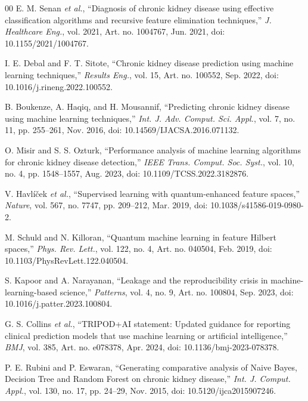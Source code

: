 \documentclass[conference]{IEEEtran}
\begin{document}
\begin{thebibliography}{00}
E. M. Senan \emph{et al.}, ``Diagnosis of chronic kidney disease using effective classification algorithms and recursive feature elimination techniques,'' \emph{J. Healthcare Eng.}, vol. 2021, Art. no. 1004767, Jun. 2021, doi: 10.1155/2021/1004767.

I. E. Debal and F. T. Sitote, ``Chronic kidney disease prediction using machine learning techniques,'' \emph{Results Eng.}, vol. 15, Art. no. 100552, Sep. 2022, doi: 10.1016/j.rineng.2022.100552.

B. Boukenze, A. Haqiq, and H. Mousannif, ``Predicting chronic kidney disease using machine learning techniques,'' \emph{Int. J. Adv. Comput. Sci. Appl.}, vol. 7, no. 11, pp. 255--261, Nov. 2016, doi: 10.14569/IJACSA.2016.071132.

O. Misir and S. S. Ozturk, ``Performance analysis of machine learning algorithms for chronic kidney disease detection,'' \emph{IEEE Trans. Comput. Soc. Syst.}, vol. 10, no. 4, pp. 1548--1557, Aug. 2023, doi: 10.1109/TCSS.2022.3182876.

V. Havl{\'i}{\v{c}}ek \emph{et al.}, ``Supervised learning with quantum-enhanced feature spaces,'' \emph{Nature}, vol. 567, no. 7747, pp. 209--212, Mar. 2019, doi: 10.1038/s41586-019-0980-2.

M. Schuld and N. Killoran, ``Quantum machine learning in feature Hilbert spaces,'' \emph{Phys. Rev. Lett.}, vol. 122, no. 4, Art. no. 040504, Feb. 2019, doi: 10.1103/PhysRevLett.122.040504.

S. Kapoor and A. Narayanan, ``Leakage and the reproducibility crisis in machine-learning-based science,'' \emph{Patterns}, vol. 4, no. 9, Art. no. 100804, Sep. 2023, doi: 10.1016/j.patter.2023.100804.

G. S. Collins \emph{et al.}, ``TRIPOD+AI statement: Updated guidance for reporting clinical prediction models that use machine learning or artificial intelligence,'' \emph{BMJ}, vol. 385, Art. no. e078378, Apr. 2024, doi: 10.1136/bmj-2023-078378.

P. E. Rubini and P. Eswaran, ``Generating comparative analysis of Naive Bayes, Decision Tree and Random Forest on chronic kidney disease,'' \emph{Int. J. Comput. Appl.}, vol. 130, no. 17, pp. 24--29, Nov. 2015, doi: 10.5120/ijca2015907246.


\end{thebibliography}
\end{document}
